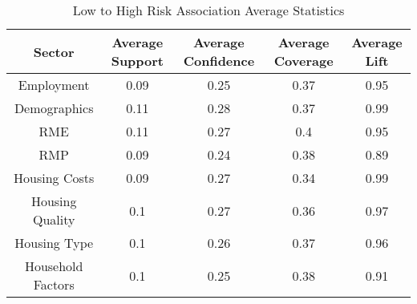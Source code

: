 \begin{table}[h]
    \centering
    \caption{Low to High Risk Association Average Statistics}
    \label{tab:low_high_risk}
    \begin{tabular}{|c|c|c|c|c|}
    \hline
    Sector & Average Support & Average Confidence & Average Coverage & Average Lift \\
    \hline
    Employment & 0.09 & 0.25 & 0.37 & 0.95 \\
    \hline
    Demographics & 0.11 & 0.28 & 0.37 & 0.99 \\
    \hline
    RME & 0.11 & 0.27 & 0.4 & 0.95 \\
    \hline
    RMP & 0.09 & 0.24 & 0.38 & 0.89 \\
    \hline
    Housing Costs & 0.09 & 0.27 & 0.34 & 0.99 \\
    \hline
    Housing Quality & 0.1 & 0.27 & 0.36 & 0.97 \\
    \hline
    Housing Type & 0.1 & 0.26 & 0.37 & 0.96 \\
    \hline
    Household Factors & 0.1 & 0.25 & 0.38 & 0.91 \\
    \hline
    \end{tabular}

    \end{table}